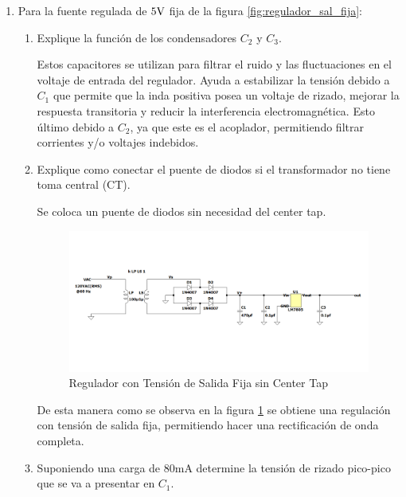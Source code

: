     \begin{enumerate}
        \item Para la fuente regulada de $5\volt$ fija de la figura \ref{fig:regulador_sal_fija}:
            \begin{enumerate}
                \item Explique la función de los condensadores $C_2$ y $C_3$.

                    Estos capacitores se utilizan para filtrar el ruido y las fluctuaciones en el voltaje de entrada del regulador. Ayuda a estabilizar la tensión debido a $C_1$ que permite que la inda positiva posea un voltaje de rizado, mejorar la respuesta transitoria y reducir la interferencia  electromagnética. Esto último debido a $C_2$, ya que este es el acoplador, permitiendo filtrar corrientes y/o voltajes indebidos.

                \item Explique como conectar el puente de diodos si el transformador no tiene toma central (CT).

                    Se coloca un puente de diodos sin necesidad del center tap.

                    \begin{figure}[H]
                        \centering
                        \includegraphics[width=15cm]{Imagenes/reg_sinct.png}
                        \caption{Regulador con Tensión de Salida Fija sin Center Tap}
                        \label{fig:reg_sinct}
                    \end{figure}

                    De esta manera como se observa en la figura \ref{fig:reg_sinct} se obtiene una regulación con tensión de salida fija, permitiendo hacer una rectificación de onda completa.

                \item Suponiendo una carga de 80mA determine la tensión de rizado pico-pico que se va a presentar en $C_1$.


\end{enumerate}
\end{enumerate}
